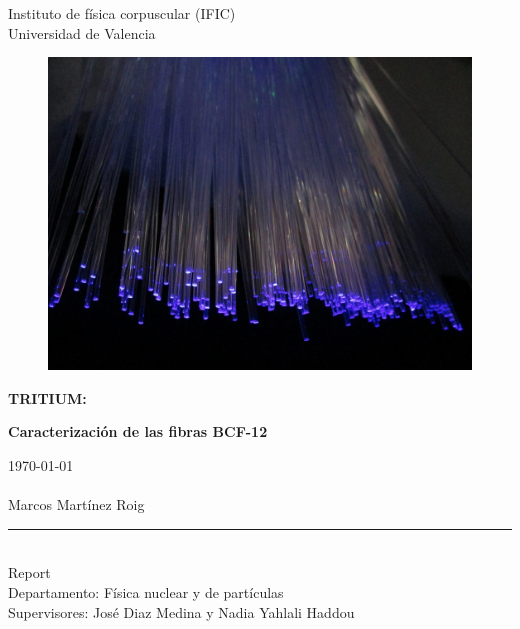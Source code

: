 \begin{titlepage}
\begin{center}
\vspace*{1cm}
Instituto de física corpuscular (IFIC)\\
Universidad de Valencia
\vspace*{0.3in}

\begin{figure}[H]
\centering
\includegraphics[scale=0.2]{Figuras/Fibers.jpg}
\end{figure}


\begin{Large}
\textbf{TRITIUM:}\\
\end{Large}
\begin{Large}
\textbf{Caracterización de las fibras BCF-12}\\
\end{Large}
\vspace*{0.2in}
\today 
\paragraph {}
\begin{large}
Marcos Martínez Roig\\
\end{large}
\vspace*{0.3in}
\rule{80mm}{0.1mm}\\
\vspace*{0.1in}
Report\\
Departamento: Física nuclear y de partículas\\
Supervisores: José Diaz Medina y Nadia Yahlali Haddou\\
\end{center}
\end{titlepage}